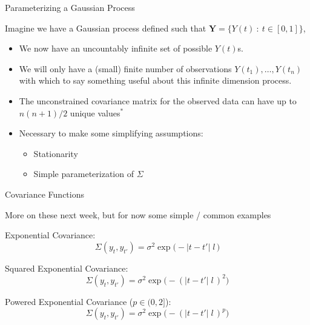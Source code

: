 \documentclass[11pt,ignorenonframetext,]{beamer}
\providecommand{\tightlist}{%
  \setlength{\itemsep}{0pt}\setlength{\parskip}{0pt}}
\begin{document}
\begin{frame}[t]{%
\protect\hypertarget{parameterizing-a-gaussian-process}{%
Parameterizing a Gaussian Process}}

Imagine we have a Gaussian process defined such that
\(\symbf{Y} = \{Y(t) ~:~ t \in [0,1]\}\),

\pause

\begin{itemize}
\tightlist
\item
  We now have an uncountably infinite set of possible \(Y(t)\)s.
\end{itemize}

\pause

\begin{itemize}
\tightlist
\item
  We will only have a (small) finite number of observations
  \(Y(t_1), \ldots, Y(t_n)\) with which to say something useful about
  this infinite dimension process.
\end{itemize}

\pause

\begin{itemize}
\tightlist
\item
  The unconstrained covariance matrix for the observed data can have up
  to \(n(n+1)/2\) unique values\(^*\)
\end{itemize}

\pause

\begin{itemize}
\item
  Necessary to make some simplifying assumptions:

  \begin{itemize}
  \item
    Stationarity
  \item
    Simple parameterization of \(\Sigma\)
  \end{itemize}
\end{itemize}

\end{frame}

\begin{frame}{%
\protect\hypertarget{covariance-functions}{%
Covariance Functions}}

More on these next week, but for now some simple / common examples

\pause

Exponential Covariance:
\[ \Sigma(y_{t},y_{t'}) = \sigma^2 \exp\big(-|t-t'| \; l\,\big) \]

\pause

Squared Exponential Covariance:
\[ \Sigma(y_{t},y_{t'}) = \sigma^2 \exp\big(-(|t-t'| \; l\,)^2\big) \]

\pause

Powered Exponential Covariance (\(p \in (0,2]\)):
\[ \Sigma(y_{t},y_{t'}) = \sigma^2 \exp\big(-(|t-t'| \; l\,)^p\big) \]

\end{frame}
\end{document}
